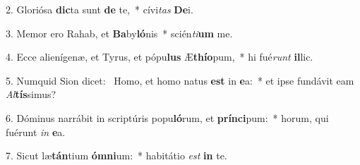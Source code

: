 2. Gloriósa \textbf{dic}ta sunt \textbf{de} te,~*  cívi\textit{tas} \textbf{De}i.\

3. Memor ero Rahab, et \textbf{Ba}by\textbf{ló}nis~*  scién\textit{ti}\textbf{um} me.\

4. Ecce alienígenæ, et Tyrus, et pópu\textbf{lus} Æ\textbf{thí}\textbf{o}pum,~*  hi fué\textit{runt} \textbf{il}lic.\

5. Numquid Sion dicet: \dag\  Homo, et homo natus \textbf{est} in \textbf{e}a:~*  et ipse fundávit eam \textit{Al}\textbf{tís}simus?\

6. Dóminus narrábit in scriptúris popu\textbf{ló}rum, et \textbf{prín}\textbf{ci}pum:~*  horum, qui fuérunt \textit{in} \textbf{e}a.\

7. Sicut læ\textbf{tán}tium \textbf{óm}\textbf{ni}um:~*  habitátio \textit{est} \textbf{in} te.\

